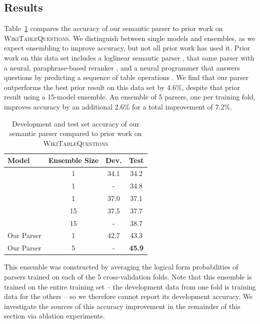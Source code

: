 \subsection{Results}
Table~\ref{tab:nnsp_wikitables_results} compares the accuracy of our semantic parser 
to prior work on \textsc{WikiTableQuestions}.
We distinguish between single models and ensembles, as we expect ensembling to 
improve accuracy, but not all prior work has used it.
Prior work on this data set includes a loglinear semantic parser 
\citep{pasupat2015compositional}, that same parser with a neural, paraphrase-based reranker 
\citep{haug2017neural}, and a neural programmer that answers questions by predicting a 
sequence of table operations \citep{Neelakantan2016LearningAN}.  
We find that our parser outperforms the best prior result on this data set by 
4.6\%, despite that prior result using a 15-model ensemble.
An ensemble of 5 parsers, one per training fold, improves accuracy by an 
additional 2.6\% for a total improvement of 7.2\%.
\begin{table}
    \centering
    \begin{tabular}{|l|c|c|c|}
	\hline
        \textbf{Model} & \textbf{Ensemble Size} & \textbf{Dev.} & \textbf{Test} \\
        \hline 
        \cite{Neelakantan2016LearningAN} & 1 & 34.1 & 34.2 \\
        \cite{haug2017neural} & 1 & - & 34.8 \\
        \cite{pasupat2015compositional} & 1 & 37.0 & 37.1 \\
        \cite{Neelakantan2016LearningAN} & 15 & 37.5 & 37.7 \\
        \cite{haug2017neural} & 15 & - & 38.7 \\
        \hline
        Our Parser & 1 & 42.7 & 43.3 \\
        Our Parser & 5 & - & \textbf{45.9} \\
        \hline
    \end{tabular}
    \caption{Development and test set accuracy of our semantic parser compared to prior work on \textsc{WikiTableQuestions}}
    \label{tab:nnsp_wikitables_results}
\end{table}

This ensemble was constructed by averaging the logical form probabilities of parsers trained on each of the 5 cross-validation folds.
Note that this ensemble is trained on the entire training set -- the development data from one fold is training data
for the others -- so we therefore cannot report its development accuracy.
We investigate the sources of this accuracy improvement in the remainder of this section via ablation experiments.

